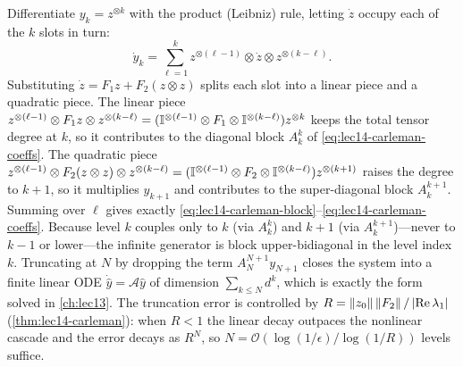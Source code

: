 \begin{solution}
Differentiate $y_k=z^{\otimes k}$ with the product (Leibniz) rule, letting $\dot z$ occupy each of
the $k$ slots in turn:
\[
  \dot y_k=\sum_{\ell=1}^{k}z^{\otimes(\ell-1)}\otimes\dot z\otimes z^{\otimes(k-\ell)}.
\]
Substituting $\dot z=F_1 z+F_2(z\otimes z)$ splits each slot into a linear piece and a quadratic
piece. The linear piece $z^{\otimes(\ell-1)}\otimes F_1 z\otimes z^{\otimes(k-\ell)}
=(\mathbb{I}^{\otimes(\ell-1)}\otimes F_1\otimes\mathbb{I}^{\otimes(k-\ell)})z^{\otimes k}$ keeps the total
tensor degree at $k$, so it contributes to the diagonal block $A_k^k$ of
\eqref{eq:lec14-carleman-coeffs}. The quadratic piece $z^{\otimes(\ell-1)}\otimes F_2(z\otimes z)
\otimes z^{\otimes(k-\ell)}=(\mathbb{I}^{\otimes(\ell-1)}\otimes F_2\otimes\mathbb{I}^{\otimes(k-\ell)})
z^{\otimes(k+1)}$ raises the degree to $k+1$, so it multiplies $y_{k+1}$ and contributes to the
super-diagonal block $A_k^{k+1}$. Summing over $\ell$ gives exactly
\eqref{eq:lec14-carleman-block}--\eqref{eq:lec14-carleman-coeffs}. Because level $k$ couples only to
$k$ (via $A_k^k$) and $k+1$ (via $A_k^{k+1}$)---never to $k-1$ or lower---the infinite generator is
block upper-bidiagonal in the level index $k$. Truncating at $N$ by dropping the term
$A_N^{N+1}y_{N+1}$ closes the system into a finite linear ODE $\dot{\hat y}=\mathcal A\hat y$ of
dimension $\sum_{k\le N}d^k$, which is exactly the form solved in \cref{ch:lec13}. The truncation
error is controlled by $R=\left\lVert z_0 \right\rVert\left\lVert F_2 \right\rVert/\left\lvert \mathrm{Re}\,\lambda_1 \right\rvert$
(\cref{thm:lec14-carleman}): when $R<1$ the linear decay outpaces the nonlinear cascade and the
error decays as $R^N$, so $N=\mathcal O(\log(1/\epsilon)/\log(1/R))$ levels suffice.
\end{solution}

